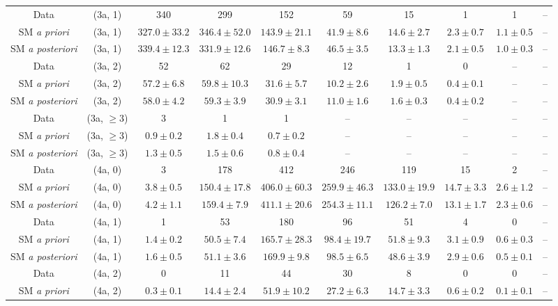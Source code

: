 \begin{table}[h!]
{\begin{tabular}{cccccccccc}
	Data & (3a, 1) & 340 & 299 & 152 & 59 & 15 & 1 & 1 & -- \\[0.5ex] 
	SM \textit{a priori} & (3a, 1) & $327.0\pm 33.2$ & $346.4\pm 52.0$ & $143.9\pm 21.1$ & $41.9\pm 8.6$ & $14.6\pm 2.7$ & $2.3\pm 0.7$ & $1.1\pm 0.5$ & -- \\[0.5ex] 
	SM \textit{a posteriori} & (3a, 1) & $339.4\pm 12.3$ & $331.9\pm 12.6$ & $146.7\pm 8.3$ & $46.5\pm 3.5$ & $13.3\pm 1.3$ & $2.1\pm 0.5$ & $1.0\pm 0.3$ & -- \\[0.5ex] 
	Data & (3a, 2) & 52 & 62 & 29 & 12 & 1 & 0 & -- & -- \\[0.5ex] 
	SM \textit{a priori} & (3a, 2) & $57.2\pm 6.8$ & $59.8\pm 10.3$ & $31.6\pm 5.7$ & $10.2\pm 2.6$ & $1.9\pm 0.5$ & $0.4\pm 0.1$ & -- & -- \\[0.5ex] 
	SM \textit{a posteriori} & (3a, 2) & $58.0\pm 4.2$ & $59.3\pm 3.9$ & $30.9\pm 3.1$ & $11.0\pm 1.6$ & $1.6\pm 0.3$ & $0.4\pm 0.2$ & -- & -- \\[0.5ex] 
	Data & (3a, $\ge3$) & 3 & 1 & 1 & -- & -- & -- & -- & -- \\[0.5ex] 
	SM \textit{a priori} & (3a, $\ge3$) & $0.9\pm 0.2$ & $1.8\pm 0.4$ & $0.7\pm 0.2$ & -- & -- & -- & -- & -- \\[0.5ex] 
	SM \textit{a posteriori} & (3a, $\ge3$) & $1.3\pm 0.5$ & $1.5\pm 0.6$ & $0.8\pm 0.4$ & -- & -- & -- & -- & -- \\[0.5ex] 
	Data & (4a, 0) & 3 & 178 & 412 & 246 & 119 & 15 & 2 & -- \\[0.5ex] 
	SM \textit{a priori} & (4a, 0) & $3.8\pm 0.5$ & $150.4\pm 17.8$ & $406.0\pm 60.3$ & $259.9\pm 46.3$ & $133.0\pm 19.9$ & $14.7\pm 3.3$ & $2.6\pm 1.2$ & -- \\[0.5ex] 
	SM \textit{a posteriori} & (4a, 0) & $4.2\pm 1.1$ & $159.4\pm 7.9$ & $411.1\pm 20.6$ & $254.3\pm 11.1$ & $126.2\pm 7.0$ & $13.1\pm 1.7$ & $2.3\pm 0.6$ & -- \\[0.5ex] 
	Data & (4a, 1) & 1 & 53 & 180 & 96 & 51 & 4 & 0 & -- \\[0.5ex] 
	SM \textit{a priori} & (4a, 1) & $1.4\pm 0.2$ & $50.5\pm 7.4$ & $165.7\pm 28.3$ & $98.4\pm 19.7$ & $51.8\pm 9.3$ & $3.1\pm 0.9$ & $0.6\pm 0.3$ & -- \\[0.5ex] 
	SM \textit{a posteriori} & (4a, 1) & $1.6\pm 0.5$ & $51.1\pm 3.6$ & $169.9\pm 9.8$ & $98.5\pm 6.5$ & $48.6\pm 3.9$ & $2.9\pm 0.6$ & $0.5\pm 0.1$ & -- \\[0.5ex] 
	Data & (4a, 2) & 0 & 11 & 44 & 30 & 8 & 0 & 0 & -- \\[0.5ex] 
	SM \textit{a priori} & (4a, 2) & $0.3\pm 0.1$ & $14.4\pm 2.4$ & $51.9\pm 10.2$ & $27.2\pm 6.3$ & $14.7\pm 3.3$ & $0.6\pm 0.2$ & $0.1\pm 0.1$ & -- \\[0.5ex] 

\end{tabular}}
\end{table}
